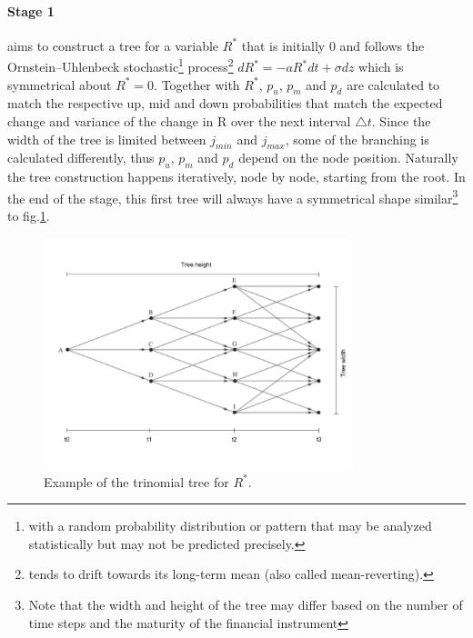 \paragraph{Stage 1}
aims to construct a tree for a variable $R^*$ that is initially 0 and follows the Ornstein–Uhlenbeck stochastic\footnote{with a random probability distribution or pattern that may be analyzed statistically but may not be predicted precisely.} process\footnote{tends to drift towards its long-term mean (also called mean-reverting).} $dR^*=-aR^*dt + \sigma dz$ which is symmetrical about $R^*=0$\cite[pg.698-699]{ofod}. Together with $R^*$, $p_u$, $p_m$ and $p_d$ are calculated to match the respective up, mid and down probabilities that match the expected change and variance of the change in R over the next interval $\triangle t$. Since the width of the tree is limited between $j_{min}$ and $j_{max}$, some of the branching is calculated differently, thus $p_u$, $p_m$ and $p_d$ depend on the node position. Naturally the tree construction happens iteratively, node by node, starting from the root. In the end of the stage, this first tree will always have a symmetrical shape similar\footnote{Note that the width and height of the tree may differ based on the number of time steps and the maturity of the financial instrument} to fig.\ref{fig:treeconststage1}. 
\begin{figure}[H]
	\centering
	\includegraphics[width=0.8\textwidth]{img/treeconststage1wh.jpg}
	\caption{Example of the trinomial tree for $R^*$.}
	\label{fig:treeconststage1}
\end{figure}

